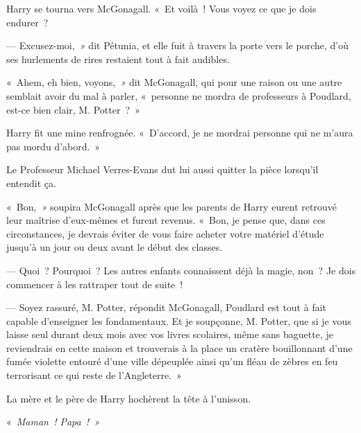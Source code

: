 Harry se tourna vers McGonagall. «~Et voilà~! Vous voyez ce que je dois endurer~?

--- Excusez-moi,\emph{~»} dit Pétunia, et elle fuit à travers la porte vers le porche, d'où ses hurlements de rires restaient tout à fait audibles.

«~Ahem, eh bien, voyons,\emph{~»} dit McGonagall, qui pour une raison ou une autre semblait avoir du mal à parler, «~personne ne mordra de professeurs à Poudlard, est-ce bien clair, M. Potter~?~»

Harry fit une mine renfrognée. «~D'accord, je ne mordrai personne qui ne m'aura pas mordu d'abord.~»

Le Professeur Michael Verres-Evans dut lui aussi quitter la pièce lorsqu'il entendit ça.

«~Bon,\emph{~»} soupira McGonagall après que les parents de Harry eurent retrouvé leur maîtrise d'eux-mêmes et furent revenus. «~Bon, je pense que, dans ces circonstances, je devrais éviter de vous faire acheter votre matériel d'étude jusqu'à un jour ou deux avant le début des classes.

--- Quoi~? Pourquoi~? Les autres enfants connaissent déjà la magie, non~? Je dois commencer à les rattraper tout de suite~!

--- Soyez rassuré, M. Potter, répondit McGonagall, Poudlard est tout à fait capable d'enseigner les fondamentaux. Et je soupçonne, M. Potter, que si je vous laisse seul durant deux mois avec vos livres scolaires, même sans baguette, je reviendrais en cette maison et trouverais à la place un cratère bouillonnant d'une fumée violette entouré d'une ville dépeuplée ainsi qu'un fléau de zèbres en feu terrorisant ce qui reste de l'Angleterre.~»

La mère et le père de Harry hochèrent la tête à l'unisson.

«~\emph{Maman~! Papa~!~»}
